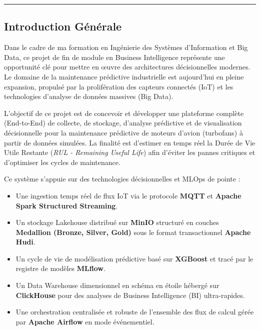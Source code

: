 \documentclass[12pt]{report}
\begin{document}
\begin{center}
  \par\nobreak\vspace{\baselineskip}
  \noindent\rule{12cm}{0.2pt}
  \par\nobreak\vspace{\baselineskip}
\end{center}

\tableofcontents
{}
\listoffigures

\begin{center}
\chapter*{Introduction Générale}
\end{center}

Dans le cadre de ma formation en Ingénierie des Systèmes d'Information et Big Data, ce projet de fin de module en Business Intelligence représente une opportunité clé pour mettre en œuvre des architectures décisionnelles modernes. Le domaine de la maintenance prédictive industrielle est aujourd'hui en pleine expansion, propulsé par la prolifération des capteurs connectés (IoT) et les technologies d'analyse de données massives (Big Data).

L'objectif de ce projet est de concevoir et développer une plateforme complète (End-to-End) de collecte, de stockage, d'analyse prédictive et de visualisation décisionnelle pour la maintenance prédictive de moteurs d'avion (turbofans) à partir de données simulées. La finalité est d'estimer en temps réel la Durée de Vie Utile Restante (\textit{RUL - Remaining Useful Life}) afin d'éviter les pannes critiques et d'optimiser les cycles de maintenance.

Ce système s'appuie sur des technologies décisionnelles et MLOps de pointe :
\begin{itemize}
    \item Une ingestion temps réel de flux IoT via le protocole \textbf{MQTT} et \textbf{Apache Spark Structured Streaming}.
    \item Un stockage Lakehouse distribué sur \textbf{MinIO} structuré en couches \textbf{Medallion (Bronze, Silver, Gold)} sous le format transactionnel \textbf{Apache Hudi}.
    \item Un cycle de vie de modélisation prédictive basé sur \textbf{XGBoost} et tracé par le registre de modèles \textbf{MLflow}.
    \item Un Data Warehouse dimensionnel en schéma en étoile hébergé sur \textbf{ClickHouse} pour des analyses de Business Intelligence (BI) ultra-rapides.
    \item Une orchestration centralisée et robuste de l'ensemble des flux de calcul gérée par \textbf{Apache Airflow} en mode événementiel.
\end{itemize}
\end{document}
